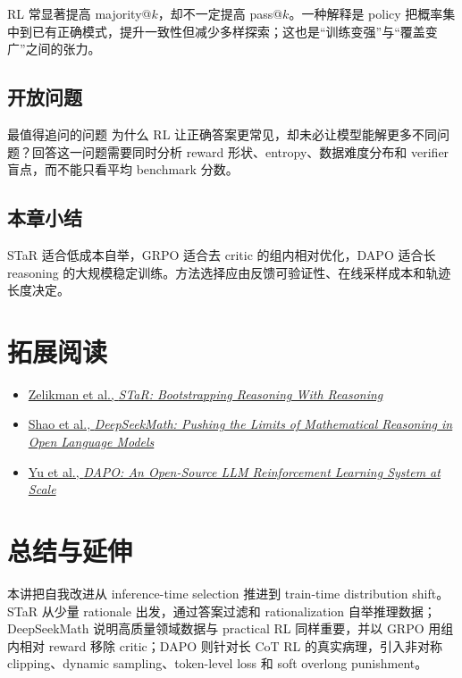 \documentclass[a4paper]{article}
\begin{document}
RL 常显著提高 majority@$k$，却不一定提高 pass@$k$。一种解释是 policy 把概率集中到已有正确模式，提升一致性但减少多样探索；这也是“训练变强”与“覆盖变广”之间的张力。

\subsection{开放问题}


\begin{importantbox}{最值得追问的问题}
为什么 RL 让正确答案更常见，却未必让模型能解更多不同问题？回答这一问题需要同时分析 reward 形状、entropy、数据难度分布和 verifier 盲点，而不能只看平均 benchmark 分数。
\end{importantbox}

\subsection{本章小结}

STaR 适合低成本自举，GRPO 适合去 critic 的组内相对优化，DAPO 适合长 reasoning 的大规模稳定训练。方法选择应由反馈可验证性、在线采样成本和轨迹长度决定。

\section{拓展阅读}

\begin{itemize}
    \item \href{https://arxiv.org/abs/2203.14465}{Zelikman et al., \emph{STaR: Bootstrapping Reasoning With Reasoning}}
    \item \href{https://arxiv.org/abs/2402.03300}{Shao et al., \emph{DeepSeekMath: Pushing the Limits of Mathematical Reasoning in Open Language Models}}
    \item \href{https://arxiv.org/abs/2503.14476}{Yu et al., \emph{DAPO: An Open-Source LLM Reinforcement Learning System at Scale}}
\end{itemize}

\section{总结与延伸}

本讲把自我改进从 inference-time selection 推进到 train-time distribution shift。STaR 从少量 rationale 出发，通过答案过滤和 rationalization 自举推理数据；DeepSeekMath 说明高质量领域数据与 practical RL 同样重要，并以 GRPO 用组内相对 reward 移除 critic；DAPO 则针对长 CoT RL 的真实病理，引入非对称 clipping、dynamic sampling、token-level loss 和 soft overlong punishment。
\end{document}
